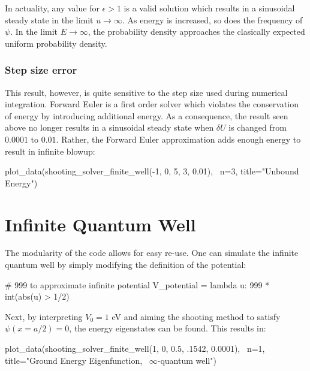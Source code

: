 \documentclass{article}
\begin{document}
In actuality, any value for $\epsilon > 1$ is a valid solution which results in
a sinusoidal steady state in the limit $u \rightarrow \infty$. As energy is
increased, so does the frequency of $\psi$. In the limit $E \rightarrow \infty$, 
the probability density approaches the clasically expected uniform probability density. 

\subsubsection{Step size error}
This result, however, is quite sensitive to the step size used during 
numerical integration. Forward Euler is a first order solver which 
violates the conservation of energy by introducing additional energy. As a consequence,
the result seen above no longer results in a sinusoidal steady state when
$\delta U$ is changed from $0.0001$ to $0.01$. Rather, the Forward Euler
approximation adds enough energy to result in infinite blowup:

\begin{sageblock}
    plot_data(shooting_solver_finite_well(-1, 0, 5, 3, 0.01), \
              n=3, title="Unbound Energy")
\end{sageblock}
\begin{figure}[H]
\end{figure}

\section{Infinite Quantum Well}
The modularity of the code allows for easy re-use. One can simulate the
infinite quantum well by simply modifying the definition of the potential:

\begin{sageblock}
# 999 to approximate infinite potential
V_potential = lambda u: 999 * int(abs(u) > 1/2)
\end{sageblock}

Next, by interpreting $V_0 = 1$ eV and aiming the shooting method to satisfy
$\psi(x = a/2) = 0$, the energy eigenstates can be found. This results in:

\begin{sageblock}
    plot_data(shooting_solver_finite_well(1, 0, 0.5, .1542, 0.0001), \
              n=1, title="Ground Energy Eigenfunction, \
              $\infty$-quantum well")
\end{sageblock}
\begin{figure}[H]
\end{figure}
\end{document}
